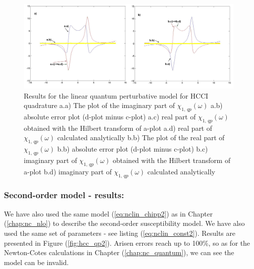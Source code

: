 \documentclass[12pt,twoside,a4paper]{article}
\numberwithin{equation}{subsection}
\numberwithin{figure}{subsection}
\begin{document}
\begin{figure}
  \includegraphics[width=150mm]{img/hcc_qp1.png}
  \caption{Results for the linear quantum perturbative model for HCCI quadrature
    a.a) The plot of the imaginary part of ${\chi_{1, \, qp}}(\omega )$
    a.b) absolute error plot (d-plot minus c-plot) 
    a.c) real part of ${\chi_{1, \, qp}}(\omega )$ obtained with the Hilbert transform of a-plot 
    a.d) real part of ${\chi_{1, \, qp}}(\omega )$ calculated analytically 
    b.b) The plot of the real part of ${\chi_{1, \, qp}}(\omega )$ 
    b.b) absolute error plot (d-plot minus c-plot) 
    b.c) imaginary part of ${\chi_{1, \, qp}}(\omega )$ obtained with the Hilbert transform of a-plot 
    b.d) imaginary part of ${\chi_{1, \, qp}}(\omega )$ calculated analytically  
    \label{fig:hcc_qp1}
  }
\end{figure}

\subsubsection*{Second-order model - results:}

We have also used the same model (\ref{eq:nclin_chipp2}) as in Chapter (\ref{chap:nc_nlo}) to describe the second-order susceptibility
model. We have also used the same set of parameters - see listing (\ref{eq:nclin_const2}). Results are presented in Figure
(\ref{fig:hcc_qp2}). Arisen errors reach up to 100\%, so as for the Newton-Cotes calculations in Chapter (\ref{chap:nc_quantum}), we
can see the model can be invalid.
\end{document}
